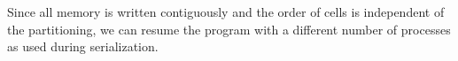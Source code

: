 



Since all memory is written contiguously and the order of cells is independent of the partitioning, we can resume the program with a different number of processes as used during serialization.

